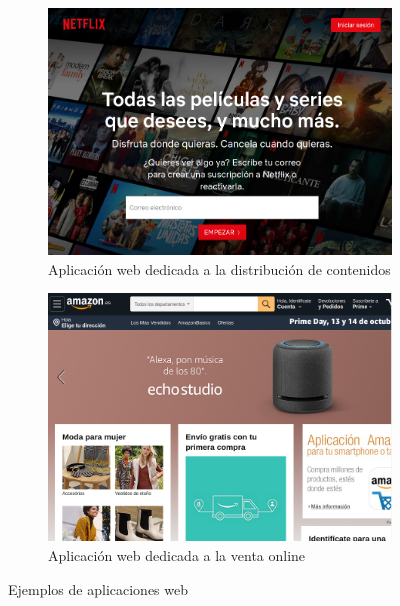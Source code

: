 \begin{figure}[!h]
  \begin{subfigure}[b]{0.5\textwidth}
    \includegraphics[width=\textwidth, height=\textwidth]{netflix.png}
    \caption{Aplicación web dedicada a la distribución de contenidos}
  \end{subfigure}
        \hfill
  \begin{subfigure}[b]{0.5\textwidth}
    \includegraphics[width=\textwidth, height=\textwidth]{amazon.png}
    \caption{Aplicación web dedicada a la venta online}
  \end{subfigure}
\caption{Ejemplos de aplicaciones web}
\label{fig:ejemplosaplicaciones}
\end{figure}

